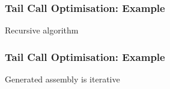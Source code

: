 \begin{frame}
  \frametitle{Tail Call Optimisation: Example}
  \begin{center}
    Recursive algorithm
  \end{center}
\end{frame}

\begin{frame}
  \frametitle{Tail Call Optimisation: Example}
  \begin{center}
    Generated assembly is iterative
  \end{center}
\end{frame}


